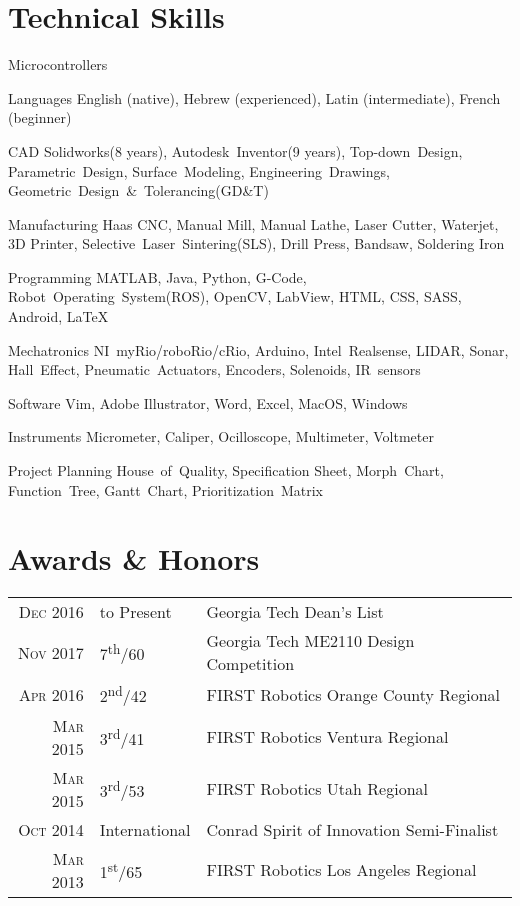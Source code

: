 \documentclass{resume}
\begin{document}
\section{Technical Skills}
\begin{skills}{Microcontrollers}
  \item [Languages] English (native), Hebrew (experienced), Latin (intermediate), French (beginner)
  \item [CAD] Solidworks(8 years), Autodesk~Inventor(9 years), Top-down~Design, Parametric~Design, Surface~Modeling, Engineering~Drawings, Geometric~Design~\&~Tolerancing(GD\&T)
  \item [Manufacturing] Haas CNC, Manual Mill, Manual Lathe, Laser Cutter, Waterjet, 3D Printer, Selective~Laser~Sintering(SLS), Drill Press, Bandsaw, Soldering Iron
  \item [Programming] MATLAB, Java, Python, G-Code, Robot~Operating~System(ROS), OpenCV, LabView, HTML, CSS, SASS, Android, \LaTeX
  \item [Mechatronics] NI~myRio/roboRio/cRio, Arduino, Intel~Realsense, LIDAR, Sonar, Hall~Effect, Pneumatic~Actuators, Encoders, Solenoids, IR~sensors
  \item [Software] Vim, Adobe Illustrator, Word, Excel, MacOS, Windows
  \item [Instruments] Micrometer, Caliper, Ocilloscope, Multimeter, Voltmeter
  \item [Project Planning] House~of~Quality, Specification Sheet, Morph~Chart, Function~Tree, Gantt~Chart, Prioritization~Matrix
\end{skills}

\section{Awards \& Honors}
\begin{tabular}{rll}
  \textsc{Dec} 2016 & to Present & Georgia Tech Dean's List\\
  \textsc{Nov} 2017 & 7\textsuperscript{th}/60 & Georgia Tech ME2110 Design Competition\\
  \textsc{Apr} 2016 & 2\textsuperscript{nd}/42 & FIRST Robotics Orange County Regional\\
  \textsc{Mar} 2015 & 3\textsuperscript{rd}/41 & FIRST Robotics Ventura Regional\\
  \textsc{Mar} 2015 & 3\textsuperscript{rd}/53 & FIRST Robotics Utah Regional\\
  \textsc{Oct} 2014 & International & Conrad Spirit of Innovation Semi-Finalist\\
  \textsc{Mar} 2013 & 1\textsuperscript{st}/65 & FIRST Robotics Los Angeles Regional\\
\end{tabular}
\end{document}
